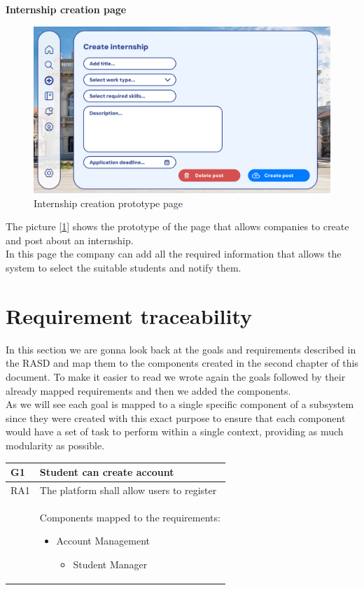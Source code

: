 \documentclass[11pt,twoside]{article}
\begin{document}
\newpage

\large{\textbf{Internship creation page}}
\begin{figure}[H]
\includegraphics[width=\textwidth]{Images/Create internship}
\caption{Internship creation prototype page}\label{Create internship}
\end{figure}
The picture [\ref{Create internship}] shows the prototype of the page that allows companies to create and post about an internship.\\
In this page the company can add all the required information that allows the system to select the suitable students and notify them.

\newpage

\section{Requirement traceability}
In this section we are gonna look back at the goals and requirements described in the RASD and map them to the components created in the second chapter of this document. To make it easier to read we wrote again the goals followed by their already mapped requirements and then we added the components.\\
As we will see each goal is mapped to a single specific component of a subsystem since they were created with this exact purpose to ensure that each component would have a set of task to perform within a single context, providing as much modularity as possible.

\begin{table}[H]
\begin{tabular}{| p{} | p{} |}
\hline
\rowcolor{Gray1}
\textbf{G1} & \textbf{Student can create account} \\
\hline
\rowcolor{Gray2}
RA1 & The platform shall allow users to register \\
\hline
 & Components mapped to the requirements:
\begin{itemize}
\item Account Management
 	\begin{itemize}
 	\item Student Manager
 	\end{itemize}
\end{itemize} \\
\hline
\end{tabular}
\end{table}
\end{document}
